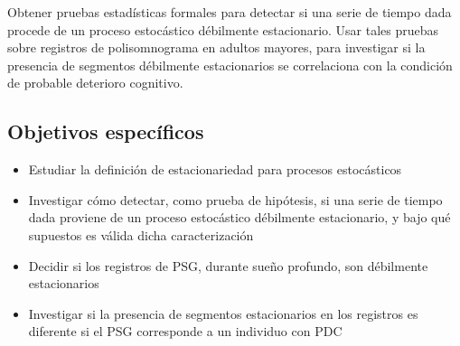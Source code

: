 Obtener pruebas estadísticas formales para detectar si una serie de tiempo dada procede de un
proceso estocástico débilmente estacionario.
%
Usar tales pruebas sobre registros de polisomnograma en adultos mayores, para investigar si la 
presencia de segmentos débilmente estacionarios se correlaciona con la condición de probable
deterioro cognitivo.


\subsection{Objetivos específicos}

\begin{itemize}
\item Estudiar la definición de estacionariedad para procesos estocásticos

\item Investigar cómo detectar, como prueba de hipótesis, si una serie de tiempo dada proviene
de un proceso estocástico débilmente estacionario, y bajo qué supuestos 
es válida dicha caracterización

\item Decidir si los registros de PSG, durante sueño profundo, son débilmente estacionarios

\item Investigar si la presencia de segmentos estacionarios en los registros es diferente si el
PSG corresponde a un individuo con PDC
\end{itemize}

